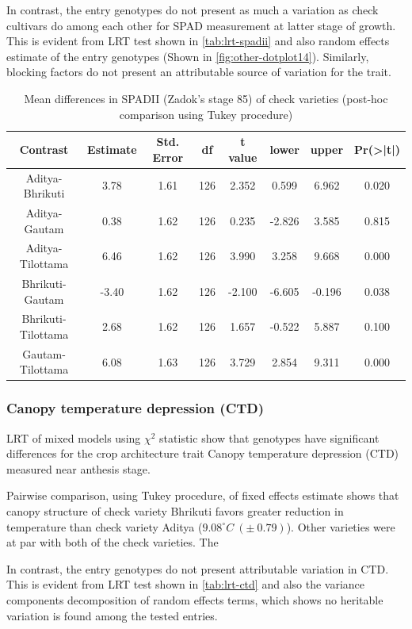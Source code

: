 \documentclass[12pt,oneside]{dukestatscithesis} %
\begin{document}
In contrast, the entry genotypes do not present as much a variation as check cultivars do among each other for SPAD measurement at latter stage of growth. This is evident from LRT test shown in \ref{tab:lrt-spadii} and also random effects estimate of the entry genotypes (Shown in \ref{fig:other-dotplot14}). Similarly, blocking factors do not present an attributable source of variation for the trait.
\begin{table}[H]

\caption{\label{tab:other-meanconf-tab4}Mean differences in SPADII (Zadok's stage 85) of check varieties (post-hoc comparison using Tukey procedure)}
\centering
\begin{tabular}[t]{cccccccc}
\toprule
Contrast & Estimate & Std. Error & df & t value & lower & upper & Pr(>|t|)\\
\midrule
Aditya-Bhrikuti & 3.78 & 1.61 & 126 & 2.352 & 0.599 & 6.962 & 0.020\\
Aditya-Gautam & 0.38 & 1.62 & 126 & 0.235 & -2.826 & 3.585 & 0.815\\
Aditya-Tilottama & 6.46 & 1.62 & 126 & 3.990 & 3.258 & 9.668 & 0.000\\
Bhrikuti-Gautam & -3.40 & 1.62 & 126 & -2.100 & -6.605 & -0.196 & 0.038\\
Bhrikuti-Tilottama & 2.68 & 1.62 & 126 & 1.657 & -0.522 & 5.887 & 0.100\\
Gautam-Tilottama & 6.08 & 1.63 & 126 & 3.729 & 2.854 & 9.311 & 0.000\\
\bottomrule
\end{tabular}
\end{table}
\hypertarget{canopy-temperature-depression-ctd}{%
\subsubsection{Canopy temperature depression (CTD)}\label{canopy-temperature-depression-ctd}}

LRT of mixed models using \(\chi^2\) statistic show that genotypes have significant differences for the crop architecture trait Canopy temperature depression (CTD) measured near anthesis stage.

Pairwise comparison, using Tukey procedure, of fixed effects estimate shows that canopy structure of check variety Bhrikuti favors greater reduction in temperature than check variety Aditya (\(9.08^\circ C\ (\pm\ 0.79)\)). Other varieties were at par with both of the check varieties. The

In contrast, the entry genotypes do not present attributable variation in CTD. This is evident from LRT test shown in \ref{tab:lrt-ctd} and also the variance components decomposition of random effects terms, which shows no heritable variation is found among the tested entries.
\end{document}

